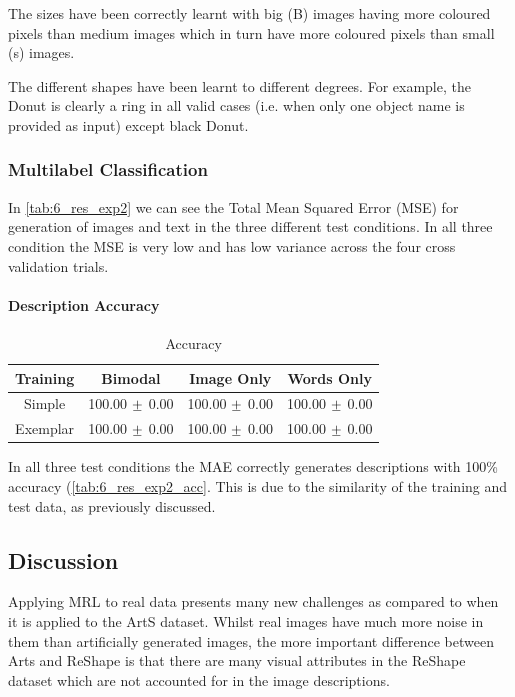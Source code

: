 The sizes have been correctly learnt with big (B) images having more coloured pixels than medium images which in turn have more coloured pixels than small (s) images.

The different shapes have been learnt to different degrees. For example, the Donut is clearly a ring in all valid cases (i.e. when only one object name is provided as input) except black Donut.



\subsubsection{Multilabel Classification}



In \autoref{tab:6_res_exp2} we can see the Total Mean Squared Error (MSE) for generation of images and text in the three different test conditions. In all three condition the MSE is very low and has low variance across the four cross validation trials.

\paragraph{Description Accuracy}
\begin{table}[h!]
\centering
	\begin{tabular}{|c|c|c|c|}
	\hline
\textbf{Training}	 & 	\textbf{Bimodal} & \textbf{Image Only} 	& 	\textbf{Words Only} \\ \hline
Simple &  100.00 $\mypm$ 0.00 & 100.00 $\mypm$ 0.00 & 100.00 $\mypm$ 0.00 \\ \hline
Exemplar & 100.00 $\mypm$ 0.00 & 100.00 $\mypm$ 0.00 & 100.00 $\mypm$ 0.00 \\ \hline
\end{tabular}
\caption{Accuracy}
\label{tab:6_res_exp2_acc}
\end{table}


In all three test conditions the MAE correctly generates descriptions with 100\% accuracy (\autoref{tab:6_res_exp2_acc}. This is due to the similarity of the training and test data, as previously discussed.

\subsection{Discussion}

Applying MRL to real data presents many new challenges as compared to when it is applied to the ArtS dataset. Whilst real images have much more noise in them than artificially generated images, the more important difference between Arts and ReShape is that there are many visual attributes in the ReShape dataset which are not accounted for in the image descriptions.

